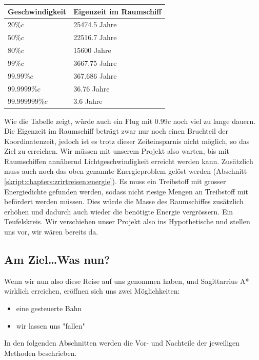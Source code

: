 \begin{refsection}
	\begin{center}
		\begin{tabular}{ | l | p{4cm} |}
			\hline
			Geschwindigkeit & Eigenzeit im Raumschiff \\ \hline
			$20\%c$ & 25474.5 Jahre \\ 
			$50\%c$ & 22516.7 Jahre \\
			$80\%c$ & 15600 Jahre \\ 
			$99\%c$ & 3667.75 Jahre \\ 
			$99.99\%c$ & 367.686 Jahre \\ 
			$99.9999\%c$ & 36.76 Jahre \\ 
			$99.999999\%c$ & 3.6 Jahre \\ \hline
		\end{tabular}
	\end{center}
	Wie die Tabelle zeigt, würde auch ein Flug mit $0.99c$ noch viel zu lange dauern. 
	Die Eigenzeit im Raumschiff beträgt zwar nur noch einen Bruchteil der Koordinatenzeit, jedoch ist es trotz dieser Zeiteinsparnis nicht möglich, so das Ziel zu erreichen.
	Wir müssen mit unserem Projekt also warten, bis mit Raumschiffen annähernd Lichtgeschwindigkeit erreicht werden kann. Zusätzlich muss auch noch das oben genannte Energieproblem gelöst werden (Abschnitt \ref{skript:chapters:zrirtreisen:energie}). Es muss ein Treibstoff mit grosser Energiedichte gefunden werden, sodass nicht riesige Mengen an Treibstoff mit befördert werden müssen. Dies würde die Masse des Raumschiffes zusätzlich erhöhen und dadurch auch wieder die benötigte Energie vergrössern. Ein Teufelskreis.
	Wir verschieben unser Projekt also ins Hypothetische und stellen uns vor, wir wären bereits da.
	
	\subsection{Am Ziel\dots Was nun?}
	
	Wenn wir nun also diese Reise auf uns genommen haben, und Sagittarrius A* wirklich erreichen, eröffnen sich uns zwei Möglichkeiten:
	\begin{itemize}
		\item eine gesteuerte Bahn
		\item wir lassen uns "fallen"
	\end{itemize}
	In den folgenden Abschnitten werden die Vor- und Nachteile der jeweiligen Methoden beschrieben.
	

\end{refsection}
